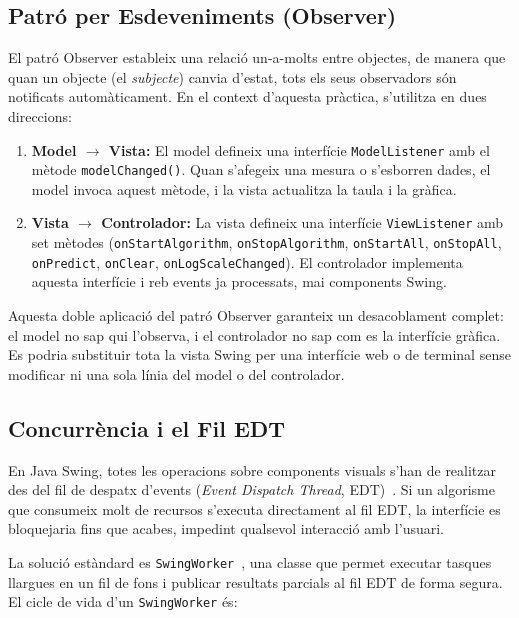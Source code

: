 \documentclass[conference,compsoc]{IEEEtran}
\begin{document}
\subsection{Patró per Esdeveniments (Observer)}

El patró Observer estableix una relació
un-a-molts entre objectes, de manera que quan un objecte (el
\textit{subjecte}) canvia d'estat, tots els seus observadors són
notificats automàticament. En el context d'aquesta pràctica, s'utilitza
en dues direccions:

\begin{enumerate}
    \item \textbf{Model $\rightarrow$ Vista:} El model defineix una
          interfície \texttt{ModelListener} amb el mètode
          \texttt{modelChanged()}. Quan s'afegeix una mesura o s'esborren
          dades, el model invoca aquest mètode, i la vista actualitza la
          taula i la gràfica.
    \item \textbf{Vista $\rightarrow$ Controlador:} La vista defineix
          una interfície \texttt{ViewListener} amb set mètodes 
          (\texttt{onStartAlgorithm}, \texttt{onStopAlgorithm},
          \texttt{onStartAll}, \texttt{onStopAll}, \texttt{onPredict},
          \texttt{onClear}, \texttt{onLogScaleChanged}). El controlador
          implementa aquesta interfície i reb events ja processats,
          mai components Swing.
\end{enumerate}

Aquesta doble aplicació del patró Observer garanteix un desacoblament
complet: el model no sap qui l'observa, i el controlador no sap com es
la interfície gràfica. Es podria substituir tota la vista Swing per una
interfície web o de terminal sense modificar ni una sola línia del model
o del controlador.

\subsection{Concurrència i el Fil EDT}

En Java Swing, totes les operacions sobre components visuals s'han de
realitzar des del fil de despatx d'events (\textit{Event Dispatch Thread},
EDT)~\cite{ref_edt_so}. Si un algorisme que consumeix molt de recursos s'executa
directament al fil EDT, la interfície es bloquejaria fins que acabes,
impedint qualsevol interacció amb l'usuari.

La solució estàndard es \texttt{SwingWorker}~\cite{ref_swing_worker}, una classe que permet
executar tasques llargues en un fil de fons i publicar resultats parcials
al fil EDT de forma segura. El cicle de vida d'un \texttt{SwingWorker} és:
\end{document}
